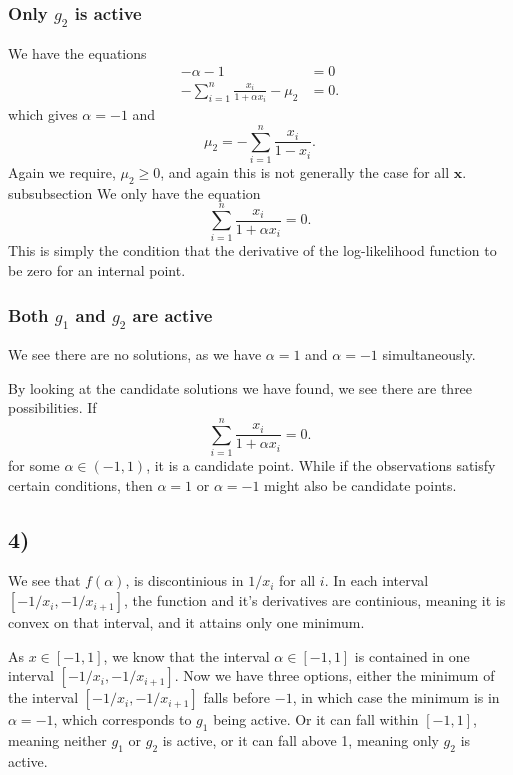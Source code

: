 \documentclass[a4paper, 11pt, notitlepage, english]{article}
\newcommand{\bt}[1]{\boldsymbol{#1}}
\begin{document}
\subsubsection*{Only $g_2$ is active}
We have the equations
\begin{align*}
    -\alpha - 1 &= 0 \\
    -\sum_{i=1}^n \frac{x_i}{1 + \alpha x_i} - \mu_2 &= 0.
\end{align*}
which gives $\alpha = -1$ and 
$$\mu_2 = -\sum_{i=1}^n \frac{x_i}{1 - x_i}.$$
Again we require, $\mu_2 \geq 0$, and again this is not generally the case for all $\bt{x}$. 
subsubsection
We only have the equation
$$\sum_{i=1}^n \frac{x_i}{1 + \alpha x_i} = 0.$$
This is simply the condition that the derivative of the log-likelihood function to be zero for an internal point.

\subsubsection*{Both $g_1$ and $g_2$ are active}
We see there are no solutions, as we have $\alpha = 1$ and $\alpha = -1$ simultaneously.

By looking at the candidate solutions we have found, we see there are three possibilities. If
$$\sum_{i=1}^n \frac{x_i}{1 + \alpha x_i} = 0.$$
for some $\alpha \in (-1,1)$, it is a candidate point. While if the observations satisfy certain conditions, then $\alpha = 1$ or $\alpha = -1$ might also be candidate points.

\subsection*{4)}
We see that $f(\alpha)$, is discontinious in $1/x_i$ for all $i$. In each interval $[-1/x_i, -1/x_{i+1}]$, the function and it's derivatives are continious, meaning it is convex on that interval, and it attains only one minimum. 

As $x \in [-1,1]$, we know that the interval $\alpha \in [-1,1]$ is contained in one interval $[-1/x_i, -1/x_{i+1}]$. Now we have three options, either the minimum of the interval $[-1/x_i, -1/x_{i+1}]$ falls before $-1$, in which case the minimum is in $\alpha = -1$, which corresponds to $g_1$ being active. Or it can fall within $[-1,1]$, meaning neither $g_1$ or $g_2$ is active, or it can fall above 1, meaning only $g_2$ is active. 
\end{document}
